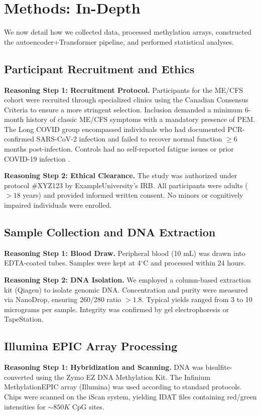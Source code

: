 \documentclass[journal]{IEEEtran}
\begin{document}
\section{Methods: In-Depth}\label{sec:methods}
We now detail how we collected data, processed methylation arrays, constructed the autoencoder+Transformer pipeline, and performed statistical analyses. 

\subsection{Participant Recruitment and Ethics}
\textbf{Reasoning Step 1: Recruitment Protocol.}
Participants for the ME/CFS cohort were recruited through specialized clinics using the Canadian Consensus Criteria to ensure a more stringent selection. Inclusion demanded a minimum 6-month history of classic ME/CFS symptoms with a mandatory presence of PEM. The Long COVID group encompassed individuals who had documented PCR-confirmed SARS-CoV-2 infection and failed to recover normal function $\geq6$ months post-infection. Controls had no self-reported fatigue issues or prior COVID-19 infection \cite{Davis2023longCOVID}.

\textbf{Reasoning Step 2: Ethical Clearance.}
The study was authorized under protocol \#XYZ123 by ExampleUniversity’s IRB. All participants were adults ($>18$ years) and provided informed written consent. No minors or cognitively impaired individuals were enrolled.

\subsection{Sample Collection and DNA Extraction}
\textbf{Reasoning Step 1: Blood Draw.}
Peripheral blood (10 mL) was drawn into EDTA-coated tubes. Samples were kept at 4$^\circ$C and processed within 24 hours.

\textbf{Reasoning Step 2: DNA Isolation.}
We employed a column-based extraction kit (Qiagen) to isolate genomic DNA. Concentration and purity were measured via NanoDrop, ensuring 260/280 ratio $>1.8$. Typical yields ranged from 3 to 10 micrograms per sample. Integrity was confirmed by gel electrophoresis or TapeStation.

\subsection{Illumina EPIC Array Processing}
\textbf{Reasoning Step 1: Hybridization and Scanning.}
DNA was bisulfite-converted using the Zymo EZ DNA Methylation Kit. The Infinium MethylationEPIC array (Illumina) was used according to standard protocols. Chips were scanned on the iScan system, yielding IDAT files containing red/green intensities for $\sim850K$ CpG sites.
\end{document}
